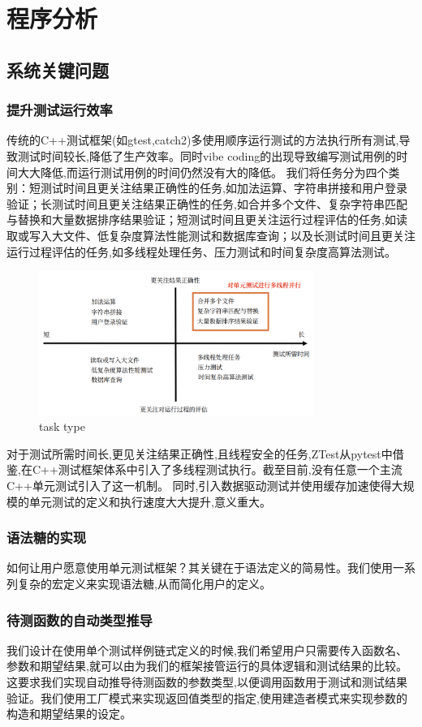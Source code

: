 \documentclass{article}
\begin{document}
\newpage
\section{程序分析}
\subsection{ 系统关键问题}
\subsubsection{提升测试运行效率}
传统的C++测试框架(如gtest,catch2)多使用顺序运行测试的方法执行所有测试,导致测试时间较长,降低了生产效率。同时vibe coding的出现导致编写测试用例的时间大大降低,而运行测试用例的时间仍然没有大的降低。
我们将任务分为四个类别：短测试时间且更关注结果正确性的任务,如加法运算、字符串拼接和用户登录验证；长测试时间且更关注结果正确性的任务,如合并多个文件、复杂字符串匹配与替换和大量数据排序结果验证；短测试时间且更关注运行过程评估的任务,如读取或写入大文件、低复杂度算法性能测试和数据库查询；以及长测试时间且更关注运行过程评估的任务,如多线程处理任务、压力测试和时间复杂度高算法测试。
\begin{figure}[H]
    \centering
    \includegraphics[width=0.8\textwidth]{img/task.png} %
    \caption{ task type}
    \label{fig:task types }
\end{figure}
对于测试所需时间长,更见关注结果正确性,且线程安全的任务,ZTest从pytest中借鉴,在C++测试框架体系中引入了多线程测试执行。截至目前,没有任意一个主流C++单元测试引入了这一机制。
同时,引入数据驱动测试并使用缓存加速使得大规模的单元测试的定义和执行速度大大提升,意义重大。
\subsubsection{语法糖的实现}
如何让用户愿意使用单元测试框架？其关键在于语法定义的简易性。我们使用一系列复杂的宏定义来实现语法糖,从而简化用户的定义。
\subsubsection{待测函数的自动类型推导}
我们设计在使用单个测试样例链式定义的时候,我们希望用户只需要传入函数名、参数和期望结果,就可以由为我们的框架接管运行的具体逻辑和测试结果的比较。
这要求我们实现自动推导待测函数的参数类型,以便调用函数用于测试和测试结果验证。我们使用工厂模式来实现返回值类型的指定,使用建造者模式来实现参数的构造和期望结果的设定。
\end{document}
